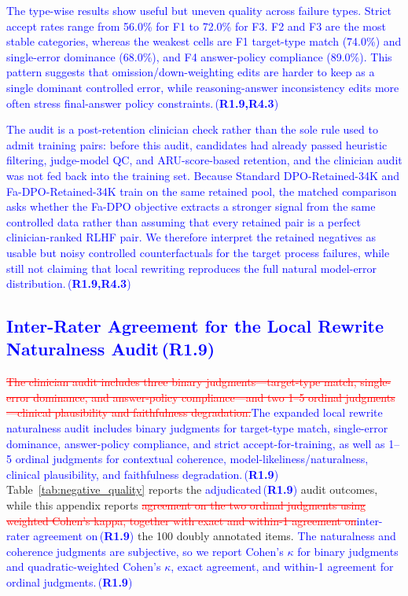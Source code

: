 \documentclass[a4paper,fleqn,doubleblind]{cas-sc}
\DeclareRobustCommand{\deleted}[1]{\textcolor{red}{\sout{#1}}}
\DeclareRobustCommand{\added}[1]{\textcolor{blue}{#1}}
\DeclareRobustCommand{\revtag}[1]{\textcolor{blue}{\scriptsize\,(\textbf{#1})}}
\begin{document}
\added{The type-wise results show useful but uneven quality across failure types. Strict accept rates range from 56.0\% for F1 to 72.0\% for F3. F2 and F3 are the most stable categories, whereas the weakest cells are F1 target-type match (74.0\%) and single-error dominance (68.0\%), and F4 answer-policy compliance (89.0\%). This pattern suggests that omission/down-weighting edits are harder to keep as a single dominant controlled error, while reasoning-answer inconsistency edits more often stress final-answer policy constraints.}\revtag{R1.9,R4.3}

\added{The audit is a post-retention clinician check rather than the sole rule used to admit training pairs: before this audit, candidates had already passed heuristic filtering, judge-model QC, and ARU-score-based retention, and the clinician audit was not fed back into the training set. Because Standard DPO-Retained-34K and Fa-DPO-Retained-34K train on the same retained pool, the matched comparison asks whether the Fa-DPO objective extracts a stronger signal from the same controlled data rather than assuming that every retained pair is a perfect clinician-ranked RLHF pair. We therefore interpret the retained negatives as usable but noisy controlled counterfactuals for the target process failures, while still not claiming that local rewriting reproduces the full natural model-error distribution.}\revtag{R1.9,R4.3}

\subsection{\added{Inter-Rater Agreement for the Local Rewrite Naturalness Audit}\revtag{R1.9}}
\label{app:ordinal_agreement}

\deleted{The clinician audit includes three binary judgments---target-type match, single-error dominance, and answer-policy compliance---and two 1--5 ordinal judgments---clinical plausibility and faithfulness degradation.}\added{The expanded local rewrite naturalness audit includes binary judgments for target-type match, single-error dominance, answer-policy compliance, and strict accept-for-training, as well as 1--5 ordinal judgments for contextual coherence, model-likeliness/naturalness, clinical plausibility, and faithfulness degradation.}\revtag{R1.9} Table~\ref{tab:negative_quality} reports the \added{adjudicated}\revtag{R1.9} audit outcomes, while this appendix reports \deleted{agreement on the two ordinal judgments using weighted Cohen's kappa, together with exact and within-1 agreement on}\added{inter-rater agreement on}\revtag{R1.9} the 100 doubly annotated items. \added{The naturalness and coherence judgments are subjective, so we report Cohen's $\kappa$ for binary judgments and quadratic-weighted Cohen's $\kappa$, exact agreement, and within-1 agreement for ordinal judgments.}\revtag{R1.9}
\end{document}
